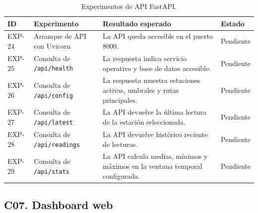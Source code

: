\begin{table}[H]
\centering
\renewcommand{\arraystretch}{1.2}
\scriptsize
\begin{tabular}{|p{}|p{}|p{}|p{}|}
\hline
\rowcolor{gray!20}
\textbf{ID} & \textbf{Experimento} & \textbf{Resultado esperado} & \textbf{Estado} \\
\hline
EXP-24 & Arranque de API con Uvicorn & La API queda accesible en el puerto 8000. & Pendiente \\
\hline
EXP-25 & Consulta de \texttt{/api/health} & La respuesta indica servicio operativo y base de datos accesible. & Pendiente \\
\hline
EXP-26 & Consulta de \texttt{/api/config} & La respuesta muestra estaciones activas, umbrales y rutas principales. & Pendiente \\
\hline
EXP-27 & Consulta de \texttt{/api/latest} & La API devuelve la última lectura de la estación seleccionada. & Pendiente \\
\hline
EXP-28 & Consulta de \texttt{/api/readings} & La API devuelve histórico reciente de lecturas. & Pendiente \\
\hline
EXP-29 & Consulta de \texttt{/api/stats} & La API calcula medias, mínimos y máximos en la ventana temporal configurada. & Pendiente \\
\hline
\end{tabular}
\caption{Experimentos de API FastAPI.}
\label{tab:exp_api}
\end{table}

\subsection{C07. Dashboard web}

